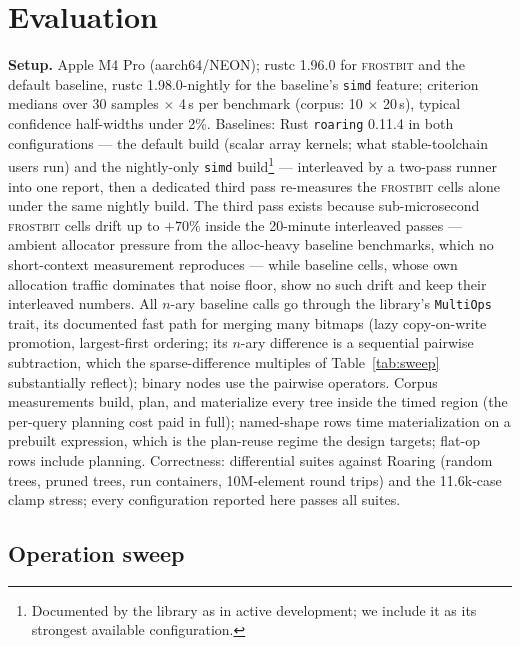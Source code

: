 \documentclass[sigconf,nonacm]{acmart}
\newcommand{\fb}{\textsc{frostbit}}
\begin{document}
\section{Evaluation}
\label{sec:eval}

\textbf{Setup.} Apple M4 Pro (aarch64/NEON); rustc 1.96.0 for \fb{} and
the default baseline, rustc 1.98.0-nightly for the baseline's
\texttt{simd} feature; criterion medians over 30 samples $\times$ 4\,s
per benchmark (corpus: 10 $\times$ 20\,s), typical confidence
half-widths under 2\%. Baselines: Rust \texttt{roaring} 0.11.4 in both
configurations --- the default build (scalar array kernels; what
stable-toolchain users run) and the nightly-only \texttt{simd}
build\footnote{Documented by the library as in active development; we
include it as its strongest available configuration.} ---
interleaved by a two-pass runner into one report, then a dedicated
third pass re-measures the \fb{} cells alone under the same nightly
build. The third pass exists because sub-microsecond \fb{} cells drift
up to $+70\%$ inside the 20-minute interleaved passes --- ambient
allocator pressure from the alloc-heavy baseline benchmarks, which no
short-context measurement reproduces --- while baseline cells, whose
own allocation traffic dominates that noise floor, show no such drift
and keep their interleaved numbers. All $n$-ary baseline
calls go through the library's \texttt{MultiOps} trait, its documented
fast path for merging many bitmaps (lazy copy-on-write promotion,
largest-first ordering; its $n$-ary difference is a sequential
pairwise subtraction, which the sparse-difference multiples of
Table~\ref{tab:sweep} substantially reflect); binary nodes use the
pairwise operators. Corpus
measurements build, plan, and materialize every tree inside the timed
region (the per-query planning cost paid in full); named-shape rows
time materialization on a prebuilt expression, which is the plan-reuse
regime the design targets; flat-op rows include planning.
Correctness: differential suites against Roaring (random trees, pruned
trees, run containers, 10M-element round trips) and the 11.6k-case
clamp stress; every configuration reported here passes all suites.

\subsection{Operation sweep}
\end{document}
